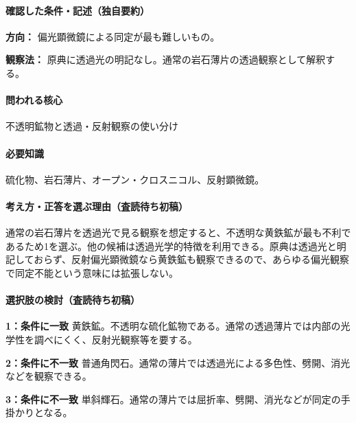 \paragraph{確認した条件・記述（独自要約）}\mbox{}\par

\noindent\textbf{方向：} 偏光顕微鏡による同定が最も難しいもの。\par

\noindent\textbf{観察法：} 原典に透過光の明記なし。通常の岩石薄片の透過観察として解釈する。\par

\paragraph{問われる核心} 不透明鉱物と透過・反射観察の使い分け

\paragraph{必要知識} 硫化物、岩石薄片、オープン・クロスニコル、反射顕微鏡。

\paragraph{考え方・正答を選ぶ理由（査読待ち初稿）} 通常の岩石薄片を透過光で見る観察を想定すると、不透明な黄鉄鉱が最も不利であるため1を選ぶ。他の候補は透過光学的特徴を利用できる。原典は透過光と明記しておらず、反射偏光顕微鏡なら黄鉄鉱も観察できるので、あらゆる偏光観察で同定不能という意味には拡張しない。

\paragraph{選択肢の検討（査読待ち初稿）}\mbox{}\par

\noindent\textbf{1：条件に一致} 黄鉄鉱。不透明な硫化鉱物である。通常の透過薄片では内部の光学性を調べにくく、反射光観察等を要する。\par

\noindent\textbf{2：条件に不一致} 普通角閃石。通常の薄片では透過光による多色性、劈開、消光などを観察できる。\par

\noindent\textbf{3：条件に不一致} 単斜輝石。通常の薄片では屈折率、劈開、消光などが同定の手掛かりとなる。\par

